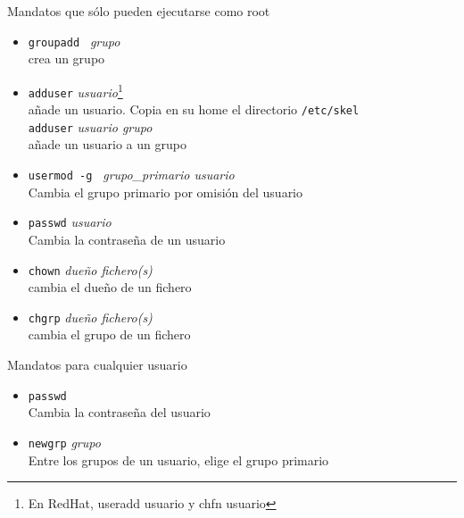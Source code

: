 \documentclass[ucs]{beamer}
\begin{document}
\begin{frame}[fragile]
Mandatos que sólo pueden ejecutarse como root
\begin{itemize}
\item \texttt{groupadd } \emph{grupo}\\  crea un grupo
\item \texttt{adduser} \emph{usuario}\footnote{En RedHat, useradd usuario y chfn usuario} \\añade un usuario. Copia en su home el directorio \verb|/etc/skel| \\
 \texttt{adduser} \emph{ usuario grupo } \\añade un usuario a un grupo
\item \texttt{usermod -g }  \emph{grupo\_primario  usuario}
\\ Cambia el grupo primario por omisión del usuario 
\item \texttt{passwd}  \emph{usuario}\\Cambia la contraseña de un usuario

\end{itemize}
\end{frame}

\begin{frame}[fragile]
\begin{itemize}

\item \texttt{chown} \emph{dueño fichero(s)}\\  cambia el dueño de un fichero
\item \texttt{chgrp} \emph{dueño fichero(s)}\\ cambia el grupo de un fichero
\end{itemize}

Mandatos para cualquier usuario
\begin{itemize}
\item \texttt{passwd} \\Cambia la contraseña del usuario
\item \texttt{newgrp}  \emph{grupo}\\Entre los grupos de un usuario, elige el grupo primario
\end{itemize}
\end{frame}
\end{document}
